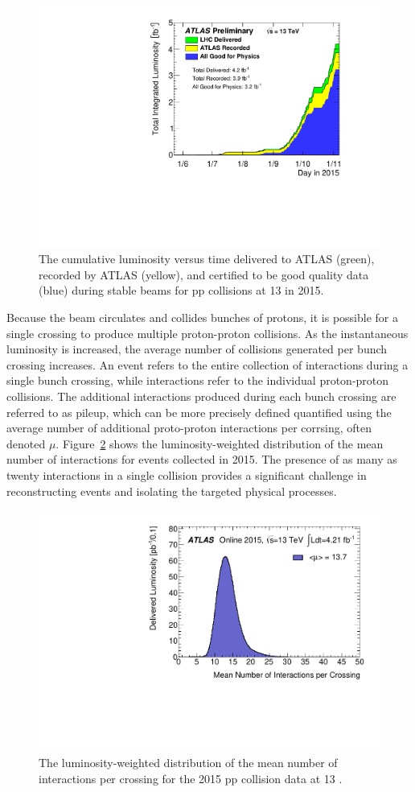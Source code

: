 \begin{figure}
\centering
\includegraphics[width=\fullfig]{figures/lumi_2015.pdf}
\caption{The cumulative luminosity versus time delivered to ATLAS (green), recorded by ATLAS (yellow), and certified to be good quality data (blue) during stable beams for pp collisions at 13 \TeV in 2015.}
\label{fig:lumi_2015}
\end{figure}

Because the beam circulates and collides bunches of protons, it is possible for a single crossing to produce multiple proton-proton collisions.
As the instantaneous luminosity is increased, the average number of collisions generated per bunch crossing increases.
An event refers to the entire collection of interactions during a single bunch crossing, while interactions refer to the individual proton-proton collisions.
The additional interactions produced during each bunch crossing are referred to as pileup, which can be more precisely defined quantified using the average number of additional proto-proton interactions per corrsing, often denoted $\mu$.
Figure~\ref{fig:mu_2015} shows the luminosity-weighted distribution of the mean number of interactions for events collected in 2015.
The presence of as many as twenty interactions in a single collision provides a significant challenge in reconstructing events and isolating the targeted physical processes. 

\begin{figure}
\centering
\includegraphics[width=\fullfig]{figures/mu_2015.pdf}
\caption{The luminosity-weighted distribution of the mean number of interactions per crossing for the 2015 pp collision data at 13 \TeV.}
\label{fig:mu_2015}
\end{figure}
